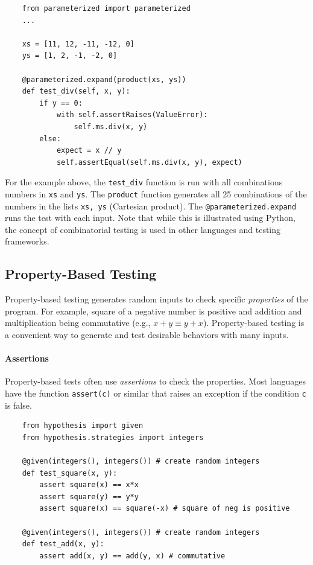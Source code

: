 \documentclass[oneside,11pt,dvipsnames]{book}
\newcommand{\code}[1]{\texttt{#1}}
\begin{document}
\begin{lstlisting}
    from parameterized import parameterized
    ...

    xs = [11, 12, -11, -12, 0]
    ys = [1, 2, -1, -2, 0]

    @parameterized.expand(product(xs, ys))
    def test_div(self, x, y):
        if y == 0:
            with self.assertRaises(ValueError):
                self.ms.div(x, y)
        else:
            expect = x // y            
            self.assertEqual(self.ms.div(x, y), expect)
\end{lstlisting}

For the example above, the \code{test\_div} function is run with all combinations numbers in \code{xs} and \code{ys}. The \code{product} function generates all 25 combinations of the numbers in the lists \code{xs, ys} (Cartesian product). The \code{@parameterized.expand} runs the test with each input. Note that while this is illustrated using Python, the concept of combinatorial testing is used in other languages and testing frameworks.

\subsection{Property-Based Testing}\label{sec:property-based-testing}
Property-based testing generates random inputs to check specific \emph{properties} of the program. For example, square of a negative number is positive and addition and multiplication being commutative (e.g., $x + y \equiv y + x$). Property-based testing is a convenient way to generate and test desirable behaviors with many inputs.

\paragraph{Assertions} Property-based tests often use \emph{assertions} to check the properties. Most languages have the function \code{assert(c)} or similar that raises an exception if the condition \code{c} is false.


\begin{lstlisting}
    from hypothesis import given
    from hypothesis.strategies import integers

    @given(integers(), integers()) # create random integers
    def test_square(x, y):
        assert square(x) == x*x
        assert square(y) == y*y
        assert square(x) == square(-x) # square of neg is positive

    @given(integers(), integers()) # create random integers
    def test_add(x, y):
        assert add(x, y) == add(y, x) # commutative
\end{lstlisting}
\end{document}
